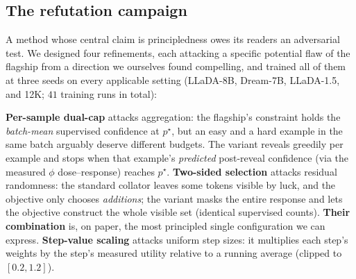 \documentclass{article} %
\begin{document}
\begin{table}[t]
\caption{\textbf{Pointwise versus population constraints} (core mean $\pm$ sd, seeds 42--44). The per-sample thermostat (psdc) pins each example's predicted difficulty to $p^\star$; the flagship pins only the batch mean. Sudoku columns (selected ckpt) show the signature collapse. All cells complete at three seeds.}
\label{tab:pointwise}
\begin{center}
\end{center}
\end{table}

\subsection*{The refutation campaign}
A method whose central claim is principledness owes its readers an adversarial test. We designed four refinements, each attacking a specific potential flaw of the flagship from a direction we ourselves found compelling, and trained all of them at three seeds on every applicable setting (LLaDA-8B, Dream-7B, LLaDA-1.5, and 12K; $41$ training runs in total):

\textbf{Per-sample dual-cap} attacks aggregation: the flagship's constraint holds the \emph{batch-mean} supervised confidence at $p^\star$, but an easy and a hard example in the same batch arguably deserve different budgets. The variant reveals greedily per example and stops when that example's \emph{predicted} post-reveal confidence (via the measured $\phi$ dose--response) reaches $p^\star$. \textbf{Two-sided selection} attacks residual randomness: the standard collator leaves some tokens visible by luck, and the objective only chooses \emph{additions}; the variant masks the entire response and lets the objective construct the whole visible set (identical supervised counts). \textbf{Their combination} is, on paper, the most principled single configuration we can express. \textbf{Step-value scaling} attacks uniform step sizes: it multiplies each step's weights by the step's measured utility relative to a running average (clipped to $[0.2, 1.2]$).
\end{document}
